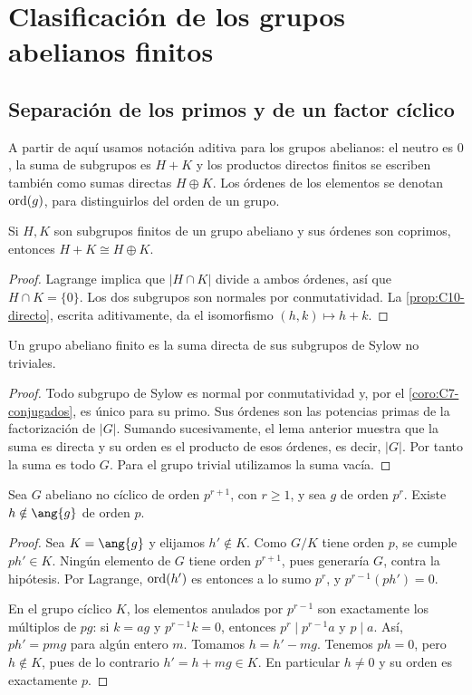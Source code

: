 \section{Clasificación de los grupos abelianos finitos}\label{sec:grupos-abelianos}

\subsection{Separación de los primos y de un factor cíclico}\label{tema:10-3-1}
A partir de aquí usamos notación aditiva para los grupos abelianos: el neutro es $0$, la suma de subgrupos es $H+K$ y los productos directos finitos se escriben también como sumas directas $H\oplus K$. Los órdenes de los elementos se denotan $\operatorname{ord}(g)$, para distinguirlos del orden de un grupo.

\begin{lema}\label{lema:C10-coprimos}
Si $H,K$ son subgrupos finitos de un grupo abeliano y sus órdenes son coprimos, entonces $H+K\cong H\oplus K$.
\end{lema}
\begin{proof}
Lagrange implica que $|H\cap K|$ divide a ambos órdenes, así que $H\cap K=\{0\}$. Los dos subgrupos son normales por conmutatividad. La \cref{prop:C10-directo}, escrita aditivamente, da el isomorfismo $(h,k)\mapsto h+k$.
\end{proof}

\begin{coro}\label{coro:C10-primarios}
Un grupo abeliano finito es la suma directa de sus subgrupos de Sylow no triviales.
\end{coro}
\begin{proof}
Todo subgrupo de Sylow es normal por conmutatividad y, por el \cref{coro:C7-conjugados}, es único para su primo. Sus órdenes son las potencias primas de la factorización de $|G|$. Sumando sucesivamente, el lema anterior muestra que la suma es directa y su orden es el producto de esos órdenes, es decir, $|G|$. Por tanto la suma es todo $G$. Para el grupo trivial utilizamos la suma vacía.
\end{proof}

\begin{lema}\label{lema:C10-auxiliar}
Sea $G$ abeliano no cíclico de orden $p^{r+1}$, con $r\ge1$, y sea $g$ de orden $p^r$. Existe $h\notin\ang{g}$ de orden $p$.
\end{lema}
\begin{proof}
Sea $K=\ang{g}$ y elijamos $h'\notin K$. Como $G/K$ tiene orden $p$, se cumple $ph'\in K$. Ningún elemento de $G$ tiene orden $p^{r+1}$, pues generaría $G$, contra la hipótesis. Por Lagrange, $\operatorname{ord}(h')$ es entonces a lo sumo $p^r$, y $p^{r-1}(ph')=0$.

En el grupo cíclico $K$, los elementos anulados por $p^{r-1}$ son exactamente los múltiplos de $pg$: si $k=ag$ y $p^{r-1}k=0$, entonces $p^r\mid p^{r-1}a$ y $p\mid a$. Así, $ph'=pmg$ para algún entero $m$. Tomamos $h=h'-mg$. Tenemos $ph=0$, pero $h\notin K$, pues de lo contrario $h'=h+mg\in K$. En particular $h\ne0$ y su orden es exactamente $p$.
\end{proof}

